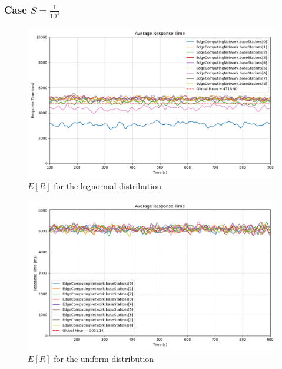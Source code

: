 \documentclass{report}
\begin{document}
\vspace{10mm}

\subsubsection*{Case $S=\frac{1}{10^4}$}

\begin{figure}[H]
    \centering
    \includegraphics[width=\textwidth]{img/plots/log_1e4_A/resptime.png}
    \caption{$E[R]$ for the lognormal distribution}
\end{figure}

\begin{figure}[H]
    \centering
    \includegraphics[width=\textwidth]{img/plots/uni_1e4_A/resptime.png}
    \caption{$E[R]$ for the uniform distribution}
\end{figure}
\end{document}
